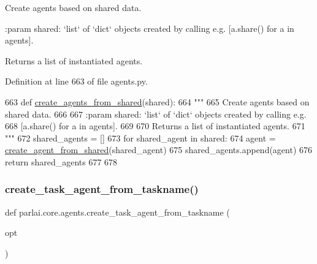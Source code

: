 \begin{DoxyVerb}Create agents based on shared data.

:param shared: `list` of `dict` objects created by calling e.g.
    [a.share() for a in agents].

Returns a list of instantiated agents.
\end{DoxyVerb}
 

Definition at line 663 of file agents.\+py.


\begin{DoxyCode}
663 \textcolor{keyword}{def }\hyperlink{namespaceparlai_1_1core_1_1agents_a5600530545f5e60a79e2d657b5af1d8c}{create\_agents\_from\_shared}(shared):
664     \textcolor{stringliteral}{"""}
665 \textcolor{stringliteral}{    Create agents based on shared data.}
666 \textcolor{stringliteral}{}
667 \textcolor{stringliteral}{    :param shared: `list` of `dict` objects created by calling e.g.}
668 \textcolor{stringliteral}{        [a.share() for a in agents].}
669 \textcolor{stringliteral}{}
670 \textcolor{stringliteral}{    Returns a list of instantiated agents.}
671 \textcolor{stringliteral}{    """}
672     shared\_agents = []
673     \textcolor{keywordflow}{for} shared\_agent \textcolor{keywordflow}{in} shared:
674         agent = \hyperlink{namespaceparlai_1_1core_1_1agents_aa5af5dd1d2f9da491b60348d479b849f}{create\_agent\_from\_shared}(shared\_agent)
675         shared\_agents.append(agent)
676     \textcolor{keywordflow}{return} shared\_agents
677 
678 
\end{DoxyCode}
\mbox{\label{namespaceparlai_1_1core_1_1agents_a76269fb567532a8fb7f29edcc20a6e47}} 
\subsubsection{\texorpdfstring{create\+\_\+task\+\_\+agent\+\_\+from\+\_\+taskname()}{create\_task\_agent\_from\_taskname()}}
{\footnotesize\ttfamily def parlai.\+core.\+agents.\+create\+\_\+task\+\_\+agent\+\_\+from\+\_\+taskname (\begin{DoxyParamCaption}\item[{}]{opt }\end{DoxyParamCaption})}



